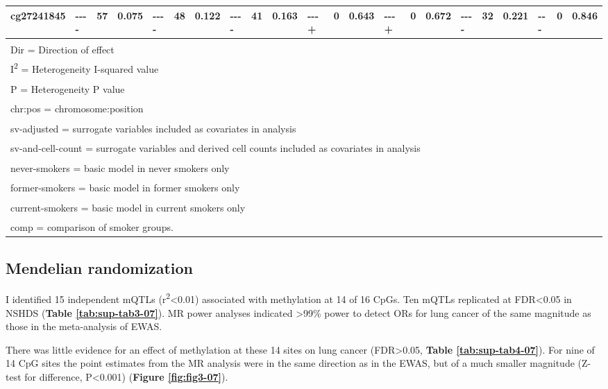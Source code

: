 \documentclass[11pt,twoside]{bristolthesis}
\begin{document}
\begin{landscape}
\begin{table}[!h]
{\begin{tabular}[t]{llllllllllllllllllllll}
\addlinespace
cg27241845 & {-}{-}{-}{-} & 57 & 0.075 & {-}{-}{-}{-} & 48 & 0.122 & {-}{-}{-}{-} & 41 & 0.163 & {-}{-}{-}{+} & 0 & 0.643 & {-}{-}{-}{+} & 0 & 0.672 & {-}{-}{-}{-} & 32 & 0.221 & {-}{-}{-} & 0 & 0.846\\
\bottomrule
\multicolumn{22}{l}{\textsuperscript{} Dir = Direction of effect}\\
\multicolumn{22}{l}{\textsuperscript{} I\textsuperscript{2} = Heterogeneity I-squared value}\\
\multicolumn{22}{l}{\textsuperscript{} P = Heterogeneity P value}\\
\multicolumn{22}{l}{\textsuperscript{} chr:pos = chromosome:position}\\
\multicolumn{22}{l}{\textsuperscript{} sv-adjusted = surrogate variables included as covariates in analysis}\\
\multicolumn{22}{l}{\textsuperscript{} sv-and-cell-count = surrogate variables and derived cell counts included as covariates in analysis}\\
\multicolumn{22}{l}{\textsuperscript{} never-smokers = basic model in never smokers only}\\
\multicolumn{22}{l}{\textsuperscript{} former-smokers = basic model in former smokers only}\\
\multicolumn{22}{l}{\textsuperscript{} current-smokers = basic model in current smokers only}\\
\multicolumn{22}{l}{\textsuperscript{} comp = comparison of smoker groups.}\\
\end{tabular}}
\end{table}
\end{landscape}
\hypertarget{results-mendelian-randomization-07}{%
\subsection{Mendelian randomization}\label{results-mendelian-randomization-07}}

I identified 15 independent mQTLs (r\textsuperscript{2}\textless0.01) associated with methylation at 14 of 16 CpGs. Ten mQTLs replicated at FDR\textless0.05 in NSHDS (\textbf{Table \ref{tab:sup-tab3-07}}). MR power analyses indicated \textgreater99\% power to detect ORs for lung cancer of the same magnitude as those in the meta-analysis of EWAS.

There was little evidence for an effect of methylation at these 14 sites on lung cancer (FDR\textgreater0.05, \textbf{Table \ref{tab:sup-tab4-07}}). For nine of 14 CpG sites the point estimates from the MR analysis were in the same direction as in the EWAS, but of a much smaller magnitude (Z-test for difference, P\textless0.001) (\textbf{Figure \ref{fig:fig3-07}}).
\end{document}
